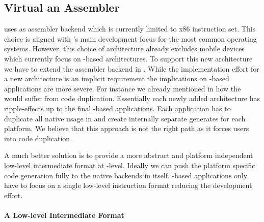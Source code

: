 \subsection{Virtual \CPU an Assembler \DSL}
\B uses \AsmJIT as assembler backend which is currently limited to x86 instruction set.
This choice is aligned with \PH's main development focus for the most common operating systems.
However, this choice of architecture already excludes mobile devices which currently focus on \ARM-based architectures.
To support this new architecture we have to extend the assembler backend in \AsmJIT.
While the implementation effort for a new \AsmJIT architecture is an implicit requirement the implications on \B-based applications are more severe.
For instance we already mentioned in  how the \NB \FFI would suffer from code duplication.
Essentially each newly added \CPU architecture has ripple-effects up to the final \B-based applications.
Each \B application has to duplicate all native usage in and create internally separate generates for each platform.
We believe that this approach is not the right path as it forces \B users into code duplication.

A much better solution is to provide a more abstract and platform independent low-level intermediate format at \B-level.
Ideally we can push the platform specific code generation fully to the native backends in \B itself.
\B-based applications only have to focus on a single low-level instruction format reducing the development effort.

\paragraph{A Low-level Intermediate Format}

 \\
 \\

